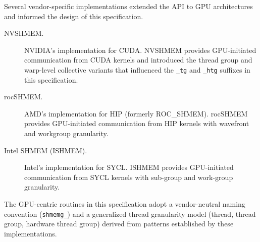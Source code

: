 
Several vendor-specific implementations extended the \openshmem \ac{API} to
\ac{GPU} architectures and informed the design of this specification.

\begin{description}
\item[NVSHMEM.] NVIDIA's \openshmem implementation for CUDA. NVSHMEM provides
  GPU-initiated communication from CUDA kernels and introduced the thread group
  and warp-level collective variants that influenced the \texttt{\_tg} and
  \texttt{\_htg} suffixes in this specification.

\item[rocSHMEM.] AMD's \openshmem implementation for HIP (formerly ROC\_SHMEM).
  rocSHMEM provides GPU-initiated communication from HIP kernels with wavefront
  and workgroup granularity.

\item[Intel SHMEM (ISHMEM).] Intel's \openshmem implementation for SYCL. ISHMEM
  provides GPU-initiated communication from SYCL kernels with sub-group and
  work-group granularity.
\end{description}

The GPU-centric routines in this specification adopt a vendor-neutral naming
convention (\texttt{shmemg\_}) and a generalized thread granularity model
(thread, thread group, hardware thread group) derived from patterns established
by these implementations.

\clearpage

